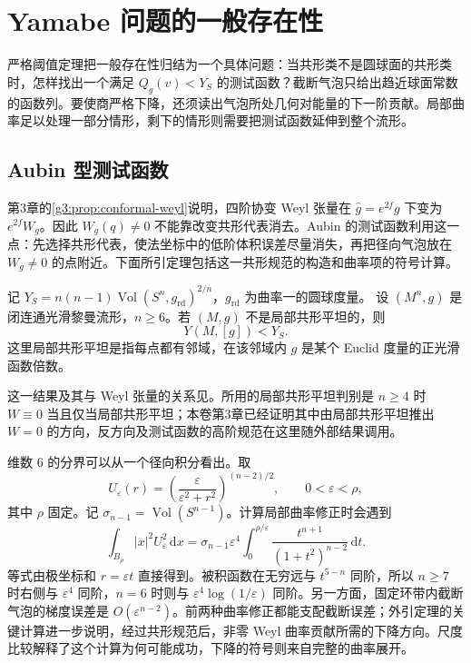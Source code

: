 
% 
% 
% 

\section{Yamabe 问题的一般存在性}
\label{g3:sec:2405}

严格阈值定理把一般存在性归结为一个具体问题：当共形类不是圆球面的共形类时，怎样找出一个满足 \(Q_g(v)<Y_S\) 的测试函数？截断气泡只给出趋近球面常数的函数列。要使商严格下降，还须读出气泡所处几何对能量的下一阶贡献。局部曲率足以处理一部分情形，剩下的情形则需要把测试函数延伸到整个流形。

\subsection{Aubin 型测试函数}
\label{g3:subsec:2405:01}
第3章的\cref{g3:prop:conformal-weyl}说明，四阶协变 Weyl 张量在 \(\widehat g=e^{2f}g\) 下变为 \(e^{2f}W_g\)。因此 \(W_g(q)\ne0\) 不能靠改变共形代表消去。Aubin 的测试函数利用这一点：先选择共形代表，使法坐标中的低阶体积误差尽量消失，再把径向气泡放在 \(W_g\ne0\) 的点附近。下面所引定理包括这一共形规范的构造和曲率项的符号计算。

\begin{theorem}\label{g3:thm:yamabe-aubin-strict}
	记 \(Y_S=n(n-1)\operatorname{Vol}(S^n,g_{\mathrm{rd}})^{2/n}\)，\(g_{\mathrm{rd}}\) 为曲率一的圆球度量。
	设 \((M^n,g)\) 是闭连通光滑黎曼流形，\(n\ge6\)。若 \((M,g)\) 不是局部共形平坦的，则
	\[
		Y(M,[g])<Y_S.
	\]
	这里局部共形平坦是指每点都有邻域，在该邻域内 \(g\) 是某个 Euclid 度量的正光滑函数倍数。
\end{theorem}
这一结果及其与 Weyl 张量的关系见\cite[定理B，第39页；第5、11节]{LeeParker1987Yamabe}。所用的局部共形平坦判别是 \(n\ge4\) 时 \(W\equiv0\) 当且仅当局部共形平坦；本卷第3章已经证明其中由局部共形平坦推出 \(W=0\) 的方向，反方向及测试函数的高阶规范在这里随外部结果调用。

\ProseParagraphBreak
维数 \(6\) 的分界可以从一个径向积分看出。取
\[
	U_\varepsilon(r)=\left(\frac{\varepsilon}{\varepsilon^2+r^2}\right)^{(n-2)/2},
	\qquad 0<\varepsilon<\rho,
\]
其中 \(\rho\) 固定。记 \(\sigma_{n-1}=\operatorname{Vol}(S^{n-1})\)。计算局部曲率修正时会遇到
\begin{equation}\label{g3:eq:yamabe-curvature-moment}
	\int_{B_\rho}|x|^2U_\varepsilon^2\,\mathrm dx
	=\sigma_{n-1}\varepsilon^4
	\int_0^{\rho/\varepsilon}\frac{t^{n+1}}{(1+t^2)^{n-2}}\,\mathrm dt.
\end{equation}
等式由极坐标和 \(r=\varepsilon t\) 直接得到。被积函数在无穷远与 \(t^{5-n}\) 同阶，所以 \(n\ge7\) 时右侧与 \(\varepsilon^4\) 同阶，\(n=6\) 时则与 \(\varepsilon^4\log(1/\varepsilon)\) 同阶。另一方面，固定环带内截断气泡的梯度误差是 \(O(\varepsilon^{n-2})\)。前两种曲率修正都能支配截断误差；外引定理的关键计算进一步说明，经过共形规范后，非零 Weyl 曲率贡献所需的下降方向。尺度比较解释了这个计算为何可能成功，下降的符号则来自完整的曲率展开。

